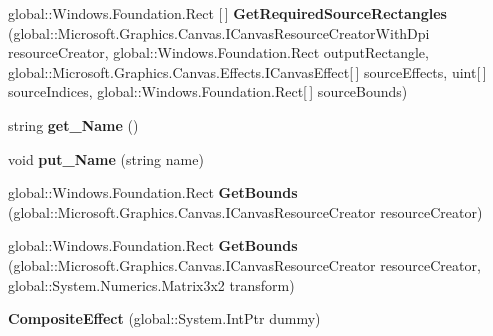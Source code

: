 \begin{DoxyCompactItemize}
global\+::\+Windows.\+Foundation.\+Rect \mbox{[}$\,$\mbox{]} {\bfseries Get\+Required\+Source\+Rectangles} (global\+::\+Microsoft.\+Graphics.\+Canvas.\+I\+Canvas\+Resource\+Creator\+With\+Dpi resource\+Creator, global\+::\+Windows.\+Foundation.\+Rect output\+Rectangle, global\+::\+Microsoft.\+Graphics.\+Canvas.\+Effects.\+I\+Canvas\+Effect\mbox{[}$\,$\mbox{]} source\+Effects, uint\mbox{[}$\,$\mbox{]} source\+Indices, global\+::\+Windows.\+Foundation.\+Rect\mbox{[}$\,$\mbox{]} source\+Bounds)
\item 
\mbox{\label{class_microsoft_1_1_graphics_1_1_canvas_1_1_effects_1_1_composite_effect_a63d03ebf847fd4f46315ca9f1773c46d}} 
string {\bfseries get\+\_\+\+Name} ()
\item 
\mbox{\label{class_microsoft_1_1_graphics_1_1_canvas_1_1_effects_1_1_composite_effect_abd53f3406b6ae816b17d0aeee7119e44}} 
void {\bfseries put\+\_\+\+Name} (string name)
\item 
\mbox{\label{class_microsoft_1_1_graphics_1_1_canvas_1_1_effects_1_1_composite_effect_a991680e8a31e88420dd24001b74e229e}} 
global\+::\+Windows.\+Foundation.\+Rect {\bfseries Get\+Bounds} (global\+::\+Microsoft.\+Graphics.\+Canvas.\+I\+Canvas\+Resource\+Creator resource\+Creator)
\item 
\mbox{\label{class_microsoft_1_1_graphics_1_1_canvas_1_1_effects_1_1_composite_effect_a403028b263af314b1162888a2320783e}} 
global\+::\+Windows.\+Foundation.\+Rect {\bfseries Get\+Bounds} (global\+::\+Microsoft.\+Graphics.\+Canvas.\+I\+Canvas\+Resource\+Creator resource\+Creator, global\+::\+System.\+Numerics.\+Matrix3x2 transform)
\item 
\mbox{\label{class_microsoft_1_1_graphics_1_1_canvas_1_1_effects_1_1_composite_effect_a32c62338e5b874000e491bacc0e032c1}} 
{\bfseries Composite\+Effect} (global\+::\+System.\+Int\+Ptr dummy)
\item 
\mbox{\label{class_microsoft_1_1_graphics_1_1_canvas_1_1_effects_1_1_composite_effect_a575ed0bb91f8f9057d8c3afe03a121e5}} 

\end{DoxyCompactItemize}
